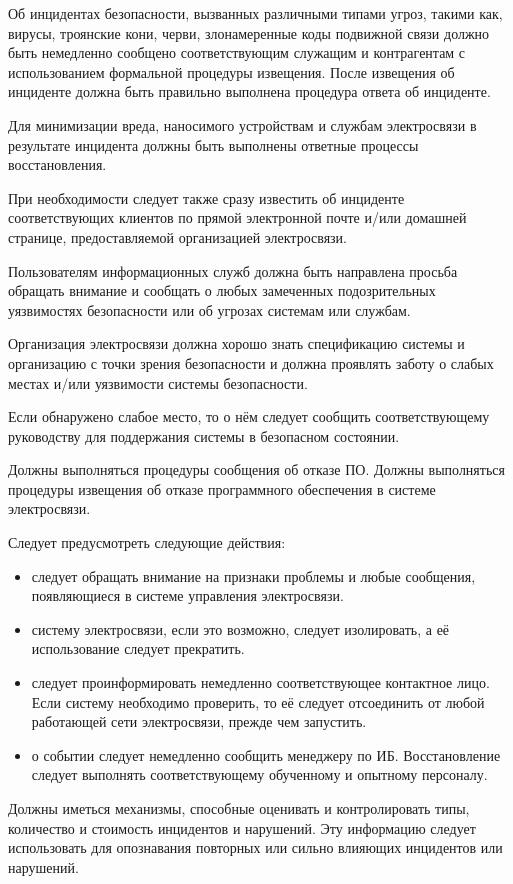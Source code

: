 \documentclass[12pt, russian, oneside, article]{ncc}
\begin{document}
Об инцидентах безопасности, вызванных различными типами угроз, такими как, вирусы, троянские кони, черви, злонамеренные коды подвижной связи должно быть немедленно сообщено соответствующим служащим и контрагентам с использованием формальной процедуры извещения. После извещения об инциденте должна быть правильно выполнена процедура ответа об инциденте.

Для минимизации вреда, наносимого устройствам и службам электросвязи в результате инцидента должны быть выполнены ответные процессы восстановления.

При необходимости следует также сразу известить об инциденте соответствующих клиентов по прямой электронной почте и/или домашней странице, предоставляемой организацией электросвязи.

Пользователям информационных служб должна быть направлена просьба обращать внимание и сообщать о любых замеченных подозрительных уязвимостях безопасности или об угрозах системам или службам.

Организация электросвязи должна хорошо знать спецификацию системы и организацию с точки зрения безопасности и должна проявлять заботу о слабых местах и/или уязвимости системы безопасности.

Если обнаружено слабое место, то о нём следует сообщить соответствующему руководству для поддержания системы в безопасном состоянии.

Должны выполняться процедуры сообщения об отказе ПО. Должны выполняться процедуры извещения об отказе программного обеспечения в системе электросвязи.

Следует предусмотреть следующие действия:
\begin{itemize}
\item следует обращать внимание на признаки проблемы и любые сообщения, появляющиеся в системе управления электросвязи.
\item систему электросвязи, если это возможно, следует изолировать, а её использование следует прекратить.
\item следует проинформировать немедленно соответствующее контактное лицо. Если систему необходимо проверить, то её следует отсоединить от любой работающей сети электросвязи, прежде чем запустить.
\item о событии следует немедленно сообщить менеджеру по ИБ. Восстановление следует выполнять соответствующему обученному и опытному персоналу.
\end{itemize}

Должны иметься механизмы, способные оценивать и контролировать типы, количество и стоимость инцидентов и нарушений. Эту информацию следует использовать для опознавания повторных или сильно влияющих инцидентов или нарушений.
\end{document}
